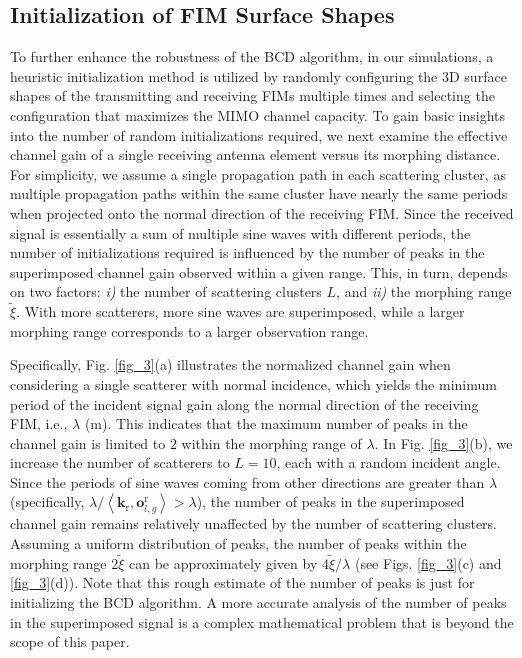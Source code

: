\documentclass[lettersize,journal]{IEEEtran}
\begin{document}
\subsection{Initialization of FIM Surface Shapes}
To further enhance the robustness of the BCD algorithm, in our simulations, a heuristic initialization method is utilized by randomly configuring the 3D surface shapes of the transmitting and receiving FIMs multiple times and selecting the configuration that maximizes the MIMO channel capacity. To gain basic insights into the number of random initializations required, we next examine the effective channel gain of a single receiving antenna element versus its morphing distance. For simplicity, we assume a single propagation path in each scattering cluster, as multiple propagation paths within the same cluster have nearly the same periods when projected onto the normal direction of the receiving FIM. Since the received signal is essentially a sum of multiple sine waves with different periods, the number of initializations required is influenced by the number of peaks in the superimposed channel gain observed within a given range. This, in turn, depends on two factors: \emph{i)} the number of scattering clusters $L$, and \emph{ii)} the morphing range $\tilde{\xi}$. With more scatterers, more sine waves are superimposed, while a larger morphing range corresponds to a larger observation range.

Specifically, Fig. \ref{fig_3}(a) illustrates the normalized channel gain when considering a single scatterer with normal incidence, which yields the minimum period of the incident signal gain along the normal direction of the receiving FIM, i.e., $\lambda$ (m). This indicates that the maximum number of peaks in the channel gain is limited to $2$ within the morphing range of $\lambda$. In Fig. \ref{fig_3}(b), we increase the number of scatterers to $L = 10$, each with a random incident angle. Since the periods of sine waves coming from other directions are greater than $\lambda$ (specifically, $\lambda/\left \langle \mathbf{k}_{\textrm{r}},\mathbf{o}_{l,g}^{\textrm{r}} \right \rangle > \lambda$), the number of peaks in the superimposed channel gain remains relatively unaffected by the number of scattering clusters. Assuming a uniform distribution of peaks, the number of peaks within the morphing range $2 \tilde{\xi}$ can be approximately given by $4 \tilde{\xi} /\lambda $ (see Figs. \ref{fig_3}(c) and \ref{fig_3}(d)). Note that this rough estimate of the number of peaks is just for initializing the BCD algorithm. A more accurate analysis of the number of peaks in the superimposed signal is a complex mathematical problem that is beyond the scope of this paper.
\end{document}
